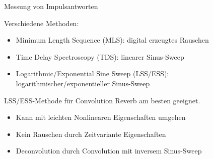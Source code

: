 \begin{frame}[allowframebreaks]{Messung von Impulsantworten}

    Verschiedene Methoden:
    \linebreak
    \begin{itemize}
        \item Minimum Length Sequence (MLS): digital erzeugtes Rauschen
        \item Time Delay Spectroscopy (TDS): linearer Sinus-Sweep
        \item Logarithmic/Exponential Sine Sweep (LSS/ESS): logarithmischer/exponentieller Sinus-Sweep
    \end{itemize}

    \framebreak

    LSS/ESS-Methode für Convolution Reverb am besten geeignet.
    \linebreak
    \begin{itemize}
        \item Kann mit leichten Nonlinearen Eigenschaften umgehen
        \item Kein Rauschen durch Zeitvariante Eigenschaften
        \item Deconvolution durch Convolution mit inversem Sinus-Sweep
    \end{itemize}
    
\end{frame}